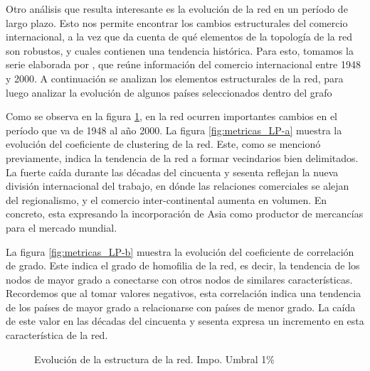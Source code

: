 \documentclass[class=article, crop=false]{standalone}
\begin{document}
Otro análisis que resulta interesante es la evolución de la red en un período de largo plazo. Esto nos permite encontrar los cambios estructurales del comercio internacional, a la vez que da cuenta de qué elementos de la topología de la red son robustos, y cuales contienen una tendencia histórica. 
Para esto, tomamos la serie elaborada por \cite{Gleditsch2002}, que reúne información del comercio internacional entre 1948 y 2000. 
A continuación se analizan los elementos estructurales de la red, para luego analizar la evolución de algunos países seleccionados dentro del grafo

Como se observa en la figura \ref{fig:metricas_LP}, en la red ocurren importantes cambios en el período que va de 1948 al año 2000. 
La figura \ref{fig:metricas_LP-a} muestra la evolución del coeficiente de clustering de la red. Este, como se mencionó previamente, indica la tendencia de la red a formar vecindarios bien delimitados. La fuerte caída durante las décadas del cincuenta y sesenta reflejan la nueva división internacional del trabajo, en dónde las relaciones comerciales se alejan del regionalismo, y el comercio inter-continental aumenta en volumen. En concreto, esta expresando la incorporación de Asia como productor de mercancías para el mercado mundial. 
\par
La figura \ref{fig:metricas_LP-b} muestra la evolución del coeficiente de correlación de grado. Este indica el grado de homofilia de la red, es decir, la tendencia de los nodos de mayor grado a conectarse con otros nodos de similares características. Recordemos que al tomar valores negativos, esta correlación indica una tendencia de los países de mayor grado a relacionarse con países de menor grado. La caída de este valor en las décadas del cincuenta y sesenta expresa un incremento en esta característica de la red.  

\begin{figure}[h!]
	\centering
	\caption{Evolución de la estructura de la red. Impo. Umbral 1\%}
	\label{fig:metricas_LP}
\end{figure}
\end{document}
